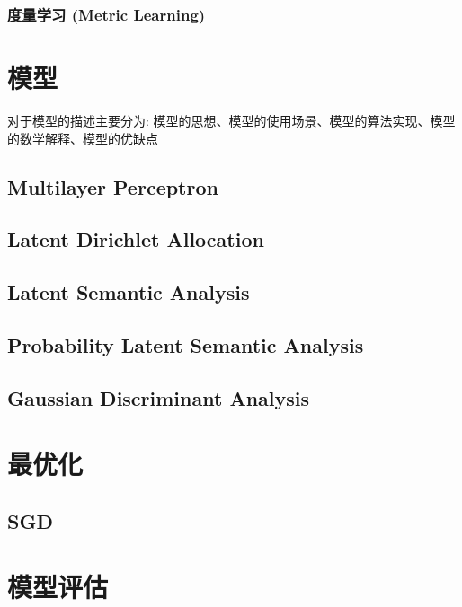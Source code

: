 \documentclass[oneside]{book}
\begin{document}
			\subsection{度量学习 (Metric Learning)}
			
			
		
	\chapter{模型}
		对于模型的描述主要分为: 模型的思想、模型的使用场景、模型的算法实现、模型的数学解释、模型的优缺点
		\section{Multilayer Perceptron}
		\section{Latent Dirichlet Allocation}
		\section{Latent Semantic Analysis}
		\section{Probability Latent Semantic Analysis}
		\section{Gaussian Discriminant Analysis}
	\chapter{最优化}
		\section{SGD}
	\chapter{模型评估}
\end{document}
